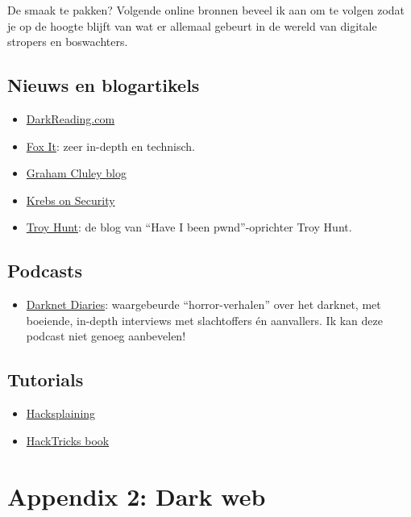 \documentclass[
  10pt,
  dutch,
  paper=a4,
  ,captions=tableheading
]{scrbook}
\providecommand{\tightlist}{%
  \setlength{\itemsep}{0pt}\setlength{\parskip}{0pt}}
\begin{document}
De smaak te pakken? Volgende online bronnen beveel ik aan om te volgen
zodat je op de hoogte blijft van wat er allemaal gebeurt in de wereld
van digitale stropers en boswachters.

\section{Nieuws en blogartikels}\label{nieuws-en-blogartikels}

\begin{itemize}
\tightlist
\item
  \href{https://www.darkreading.com/}{DarkReading.com}
\item
  \href{https://blog.fox-it.com/}{Fox It}: zeer in-depth en technisch.
\item
  \href{https://grahamcluley.com/}{Graham Cluley blog}
\item
  \href{https://krebsonsecurity.com/}{Krebs on Security}
\item
  \href{https://www.troyhunt.com/}{Troy Hunt}: de blog van ``Have I been
  pwnd''-oprichter Troy Hunt.
\end{itemize}

\section{Podcasts}\label{podcasts}

\begin{itemize}
\tightlist
\item
  \href{https://darknetdiaries.com/}{Darknet Diaries}: waargebeurde
  ``horror-verhalen'' over het darknet, met boeiende, in-depth
  interviews met slachtoffers én aanvallers. Ik kan deze podcast niet
  genoeg aanbevelen!
\end{itemize}

\section{Tutorials}\label{tutorials}

\begin{itemize}
\tightlist
\item
  \href{https://www.hacksplaining.com/lessons}{Hacksplaining}
\item
  \href{https://book.hacktricks.xyz/}{HackTricks book}
\end{itemize}

\chapter{Appendix 2: Dark web}\label{appendix-2-dark-web}
\end{document}
